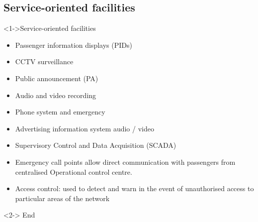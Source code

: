 \subsection{Service-oriented facilities}
\frame
{  
   
      \begin{block}<1->{Service-oriented facilities}
      \begin{itemize}
       \item Passenger information displays (PIDs)
\item CCTV surveillance
\item Public announcement (PA)
\item Audio and video recording
\item Phone system and emergency
\item Advertising information system audio / video
\item Supervisory Control and Data Acquisition (SCADA) 
\item Emergency call points allow direct communication with passengers from centralised Operational control centre.
\item Access control: used to detect and warn in the event of unauthorised access to particular areas of the network
\end{itemize}



   \end{block}
   
    \begin{block}<2->{}
   End
   \end{block}
}



